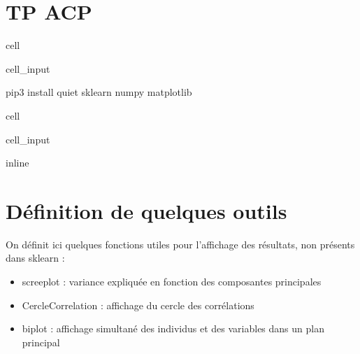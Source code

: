 \documentclass[letterpaper,10pt,french]{sphinxmanual}
\begin{document}
\chapter{TP ACP}
\label{\detokenize{TP2_ACP:tp-acp}}\label{\detokenize{TP2_ACP::doc}}
\begin{sphinxuseclass}{cell}
\begin{sphinxuseclass}{cell_input}
\begin{sphinxVerbatim}[commandchars=\\\{\}]
        
  
    pip3 install \PYGZhy{}\PYGZhy{}quiet sklearn numpy matplotlib
     
\end{sphinxVerbatim}

\end{sphinxuseclass}
\end{sphinxuseclass}
\begin{sphinxuseclass}{cell}
\begin{sphinxuseclass}{cell_input}
\begin{sphinxVerbatim}[commandchars=\\\{\}]
 inline
\PYG{p}{[}\PYG{p}{]}  
\PYG{p}{[}\PYG{p}{]}  
\PYG{p}{[}\PYG{p}{]}  
\end{sphinxVerbatim}

\end{sphinxuseclass}
\end{sphinxuseclass}

\chapter{Définition de quelques outils}
\label{\detokenize{TP2_ACP:definition-de-quelques-outils}}
\sphinxAtStartPar
On définit ici quelques fonctions utiles pour l’affichage des résultats, non présents dans sklearn :
\begin{itemize}
\item {} 
\sphinxAtStartPar
screeplot : variance expliquée en fonction des composantes principales

\item {} 
\sphinxAtStartPar
CercleCorrelation : affichage du cercle des corrélations

\item {} 
\sphinxAtStartPar
biplot : affichage simultané des individus et des variables dans un plan principal

\end{itemize}
\end{document}
